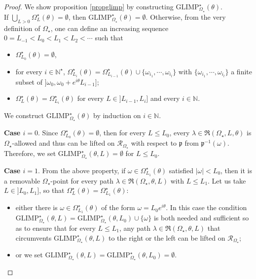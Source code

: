 \documentclass[11pt, english]{smfart}
\theoremstyle{definition}
\begin{document}
\begin{proof}
We show proposition \ref{propglimp} by constructing
$\mathrm{GLIMP}_{\Omega_\star}^\star(\theta)$. \\
If $\bigcup_{L>0}  \Omega_L^\star(\theta)= \emptyset$, 
then $ \mathrm{GLIMP}_{\Omega_\star}^\star(\theta) = \emptyset$. Otherwise,
from the very definition of $\Omega_\star$, one can define an increasing
sequence $0 = L_{-1} < L_0 <  L_1 < L_2 < \cdots $ such that
\begin{itemize}
\item  $\Omega_{L_0}^\star(\theta) = \emptyset$, 
\item  for every $i \in \mathbb{N}^\star$, 
$\Omega_{L_{i}}^\star(\theta) = \Omega_{L_{i-1}}^\star(\theta) \cup
\{\omega_{i_1}, \cdots, \omega_{i_l}\}$ 
with $\{\omega_{i_1}, \cdots, \omega_{i_l}\}$ a finite subset of
$]\omega_0, \omega_0 +e^{i\theta}L_{i-1}]$; 
\item $\Omega_{L}^\star(\theta)=\Omega_{L_{i}}^\star(\theta)$ for every $L \in
]L_{i-1}, L_i]$ and every $i \in \mathbb{N}$.
\end{itemize}
We construct $\mathrm{GLIMP}_{\Omega_\star}^\star(\theta)$ by induction on
$i \in \mathbb{N}$.

\noindent \textbf{Case $i=0$}. Since $\Omega_{L_0}^\star(\theta) = \emptyset$, then 
for every $L \leq L_0$,  every  $\lambda \in \mathfrak{R}(\Omega_\star, L, \theta)$ is
  $\Omega_\star$-allowed and thus
 can be lifted on $\mathscr{R}_{\Omega_{\star}}$ with respect to
 $\mathfrak{p}$ from $\mathfrak{p}^{-1}(\omega)$. Therefore, we set
 $\mathrm{GLIMP}_{\Omega_\star}^\star(\theta,L) = \emptyset$ for $L \leq
 L_0$.

\noindent \textbf{Case $i=1$}. From the above property, if
${\omega \in \Omega_{L_1}^\star(\theta)}$ satisfied $|\omega| <
L_0$, then it  is a removable $\Omega_\star$-point for every path $\lambda \in
\mathfrak{R}(\Omega_\star, \theta, L)$ with $L \leq L_1$. Let us take $L \in
]L_{0}, L_1]$, so that  $\Omega_{L}^\star(\theta)  = \Omega_{L_{1}}^\star(\theta)$:
\begin{itemize}
\item either there is  $\omega  \in
  \Omega_{L_{1}}^\star(\theta)$ of the form $\omega = L_0
  e^{i\theta}$. 
In this case the condition \linebreak
${ \mathrm{GLIMP}_{\Omega_\star}^\star(\theta,L) = \mathrm{GLIMP}_{\Omega_\star}^\star(\theta,L_0) \cup
\{\omega\} }$ is both needed and sufficient  so as to ensure that for every $L
\leq L_1$, any path $\lambda \in \mathfrak{R}(\Omega_\star, 
\theta, L)$  that  circumvents $\mathrm{GLIMP}_{\Omega_\star}^\star(\theta,L)$
to the right or the left can be lifted on 
$\mathscr{R}_{\Omega_{\star}}$;
\item or  we set 
 ${\mathrm{GLIMP}_{\Omega_\star}^\star(\theta,L) =
 \mathrm{GLIMP}_{\Omega_\star}^\star(\theta,L_0) = \emptyset}$.
\end{itemize}


\end{proof}
\end{document}
